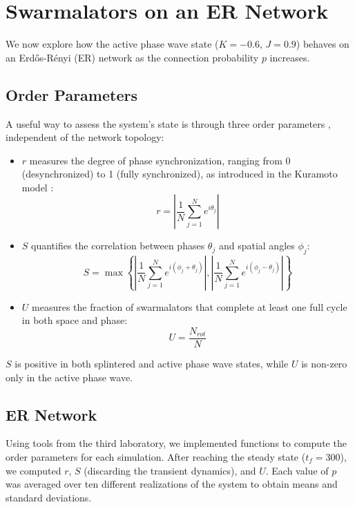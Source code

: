 \chapter{Swarmalators on an ER Network}
We now explore how the active phase wave state ($K = -0.6$, $J = 0.9$) behaves on an Erdős-Rényi (ER) network as the connection probability $p$ increases.

\section{Order Parameters}
A useful way to assess the system's state is through three order parameters \cite{O_Keeffe_2017}, independent of the network topology:
\begin{itemize}
    \item \( r \) measures the degree of phase synchronization, ranging from 0 (desynchronized) to 1 (fully synchronized), as introduced in the Kuramoto model \cite{Acebron_2005}:
    \begin{equation}
        r = \left| \frac{1}{N} \sum_{j=1}^{N} e^{i \theta_j} \right|
        \label{equation::r}
    \end{equation}
    \item \( S \) quantifies the correlation between phases \( \theta_j \) and spatial angles \( \phi_j \):
    \begin{equation}
        S = \max \left\{  \left| \frac{1}{N} \sum_{j=1}^{N} e^{i (\phi_j+\theta_j)} \right|, \left| \frac{1}{N} \sum_{j=1}^{N} e^{i (\phi_j-\theta_j)} \right| \right\}
        \label{equation::S}
    \end{equation}
    \item \( U \) measures the fraction of swarmalators that complete at least one full cycle in both space and phase:
    \begin{equation}
        U = \frac{N_{rot}}{N}
        \label{equation::U}
    \end{equation}
\end{itemize}
\( S \) is positive in both splintered and active phase wave states, while \( U \) is non-zero only in the active phase wave.

\newpage
\section{ER Network}
Using tools from the third laboratory, we implemented functions to compute the order parameters for each simulation. After reaching the steady state ($t_f = 300$), we computed \( r \), \( S \) (discarding the transient dynamics), and \( U \). Each value of $p$ was averaged over ten different realizations of the system to obtain means and standard deviations.

